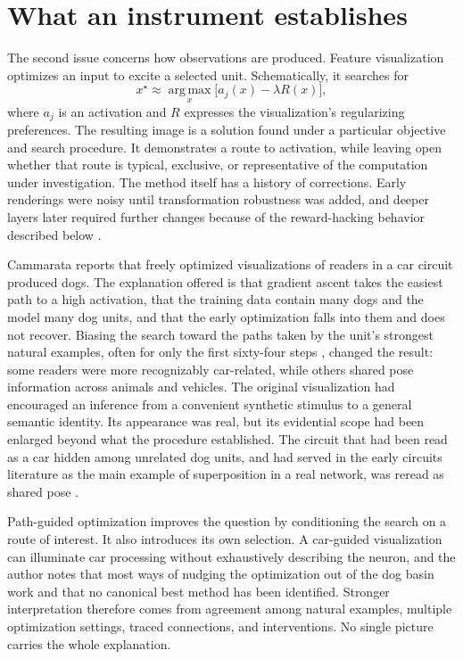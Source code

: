 \documentclass[11pt]{article}
\begin{document}
\section{What an instrument establishes}

The second issue concerns how observations are produced. Feature visualization optimizes an input to excite a selected unit. Schematically, it searches for
\[
 x^\star\approx\operatorname*{arg\,max}_{x}\bigl[a_j(x)-\lambda R(x)\bigr],
\]
where $a_j$ is an activation and $R$ expresses the visualization's regularizing preferences. The resulting image is a solution found under a particular objective and search procedure. It demonstrates a route to activation, while leaving open whether that route is typical, exclusive, or representative of the computation under investigation. The method itself has a history of corrections. Early renderings were noisy until transformation robustness was added, and deeper layers later required further changes because of the reward-hacking behavior described below \cite{olah2017}.

Cammarata reports that freely optimized visualizations of readers in a car circuit produced dogs. The explanation offered is that gradient ascent takes the easiest path to a high activation, that the training data contain many dogs and the model many dog units, and that the early optimization falls into them and does not recover. Biasing the search toward the paths taken by the unit's strongest natural examples, often for only the first sixty-four steps \cite[\emph{Feature Visualization in Later Layers}]{cammarata}, changed the result: some readers were more recognizably car-related, while others shared pose information across animals and vehicles. The original visualization had encouraged an inference from a convenient synthetic stimulus to a general semantic identity. Its appearance was real, but its evidential scope had been enlarged beyond what the procedure established. The circuit that had been read as a car hidden among unrelated dog units, and had served in the early circuits literature as the main example of superposition in a real network, was reread as shared pose \cite{olah2020}.

Path-guided optimization improves the question by conditioning the search on a route of interest. It also introduces its own selection. A car-guided visualization can illuminate car processing without exhaustively describing the neuron, and the author notes that most ways of nudging the optimization out of the dog basin work and that no canonical best method has been identified. Stronger interpretation therefore comes from agreement among natural examples, multiple optimization settings, traced connections, and interventions. No single picture carries the whole explanation.
\end{document}
